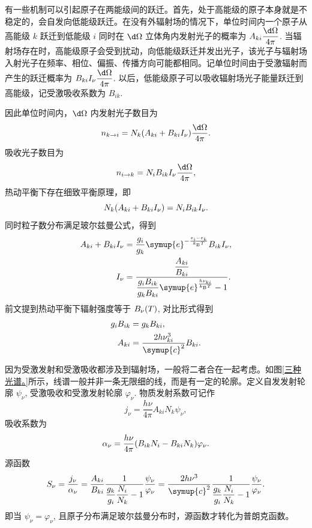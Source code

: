 \documentclass[../天体物理基础.tex]{subfiles}
\begin{document}
有一些机制可以引起原子在两能级间的跃迁。首先，处于高能级的原子本身就是不稳定的，会自发向低能级跃迁。在没有外辐射场的情况下，单位时间内一个原子从高能级 $k$ 跃迁到低能级 $i$ 同时在 $\d\Omega$ 立体角内发射光子的概率为 $A_{ki}\dfrac{\d\Omega}{4\pi}$. 当辐射场存在时，高能级原子会受到扰动，向低能级跃迁并发出光子，该光子与辐射场入射光子在频率、相位、偏振、传播方向可能都相同。记单位时间由于受激辐射而产生的跃迁概率为 $B_{ki}I_{\nu}\dfrac{\d\Omega}{4\pi}$. 以后，低能级原子可以吸收辐射场光子能量跃迁到高能级，记受激吸收系数为 $B_{ik}$.

因此单位时间内，$\d\Omega$ 内发射光子数目为
\begin{equation}
n_{k\to i}=N_{k}\mleft(A_{ki}+B_{ki}I_{\nu}\mright)\frac{\d\Omega}{4\pi}.
\end{equation}
吸收光子数目为
\begin{equation}
n_{i\to k}=N_{i}B_{ik}I_{\nu}\frac{\d\Omega}{4\pi},
\end{equation}
热动平衡下存在细致平衡原理，即
\begin{equation}
N_{k}\mleft(A_{ki}+B_{ki}I_{\nu}\mright)=N_{i}B_{ik}I_{\nu}.
\end{equation}
同时粒子数分布满足玻尔兹曼公式，得到
\begin{align}
A_{ki}+B_{ki}I_{\nu}&=\frac{g_{i}}{g_{k}}\symup{e}^{-\frac{\varepsilon_{i}-\varepsilon_{k}}{k_{\mathrm{B}}T}}B_{ik}I_{\nu},\\
I_{\nu}&=\frac{\dfrac{A_{ki}}{B_{ki}}}{\dfrac{g_{i}B_{ik}}{g_{k}B_{ki}}\symup{e}^{\frac{h\nu_{ki}}{k_{\mathrm{B}}T}}-1}.
\end{align}
前文提到热动平衡下辐射强度等于 $B_{\nu}\mleft(T\mright)$, 对比形式得到
\begin{align}
g_{i}B_{ik}&=g_{k}B_{ki},\\
A_{ki}&=\frac{2h\nu_{ki}^{3}}{\symup{c}^{2}}B_{ki}.
\end{align}

因为受激发射和受激吸收都涉及到辐射场，一般将二者合在一起考虑。如图\ref{三种光谱。}所示，线谱一般并非一条无限细的线，而是有一定的轮廓。定义自发发射轮廓 $\psi_{\nu}$, 受激吸收和受激发射轮廓 $\varphi_{\nu}$. 物质发射系数可记作
\begin{equation}
j_{\nu}=\frac{h\nu}{4\pi}A_{ki}N_{k}\psi_{\nu},
\end{equation}
吸收系数为
\begin{equation}
\alpha_{\nu}=\frac{h\nu}{4\pi}\mleft(B_{ik}N_{i}-B_{ki}N_{k}\mright)\varphi_{\nu}.\label{1.3.14}
\end{equation}
源函数
\begin{equation}
S_{\nu}=\frac{j_{\nu}}{\alpha_{\nu}}=\frac{A_{ki}}{B_{ki}}\frac{1}{\dfrac{g_{k}}{g_{i}}\dfrac{N_{i}}{N_{k}}-1}\frac{\psi_{\nu}}{\varphi
_{\nu}}=\frac{2h\nu^{3}}{\symup{c}^{2}}\frac{1}{\dfrac{g_{k}}{g_{i}}\dfrac{N_{i}}{N_{k}}-1}\frac{\psi_{\nu}}{\varphi_{\nu}}.
\end{equation}
即当 $\psi_{\nu}=\varphi_{\nu}$, 且原子分布满足玻尔兹曼分布时，源函数才转化为普朗克函数。
\end{document}
